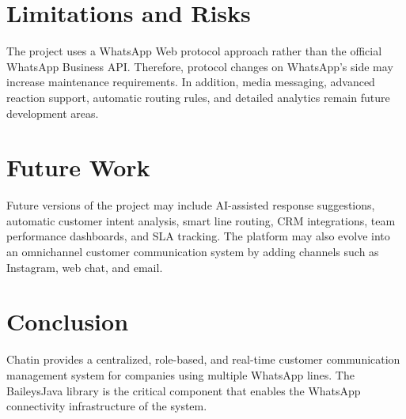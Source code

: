\documentclass[12pt,a4paper]{article}
\begin{document}
\section{Limitations and Risks}

The project uses a WhatsApp Web protocol approach rather than the official WhatsApp Business API. Therefore, protocol changes on WhatsApp's side may increase maintenance requirements. In addition, media messaging, advanced reaction support, automatic routing rules, and detailed analytics remain future development areas.

\section{Future Work}

Future versions of the project may include AI-assisted response suggestions, automatic customer intent analysis, smart line routing, CRM integrations, team performance dashboards, and SLA tracking. The platform may also evolve into an omnichannel customer communication system by adding channels such as Instagram, web chat, and email.

\section{Conclusion}

Chatin provides a centralized, role-based, and real-time customer communication management system for companies using multiple WhatsApp lines. The BaileysJava library is the critical component that enables the WhatsApp connectivity infrastructure of the system.
\end{document}
